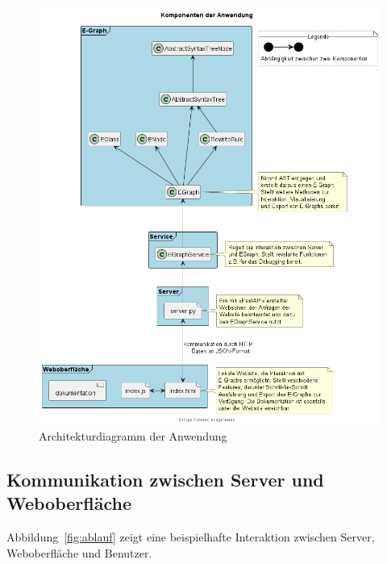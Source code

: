

\begin{figure}[H]
  \centering
  \includegraphics[scale=0.6]{../fig/components.png}
  \caption{Architekturdiagramm der Anwendung}
  \label{fig:architektur}
\end{figure}




\subsection{Kommunikation zwischen Server und Weboberfläche}


Abbildung~\ref{fig:ablauf} zeigt eine beispielhafte Interaktion zwischen Server, Weboberfläche und Benutzer.

